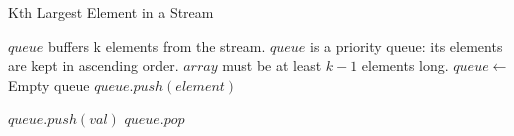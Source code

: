 \documentclass[12pt]{article}
\begin{document}
\begin{algorithm}

  \caption{Kth Largest Element in a Stream}
  \begin{algorithmic}[1]
    \Statex
        \LeftComment $queue$ buffers k elements from the stream.
        \LeftComment $queue$ is a priority queue: its elements are kept in ascending order.
        \LeftComment $array$ must be at least $k-1$ elements long.
        \Statex
        \State $queue \gets$ Empty queue
            \State $queue.push(element)$
        \EndFor
    \EndFunction

    \Statex
    \Statex
    
        \State $queue.push(val)$
            \State $queue.pop$
        \EndWhile
        \State {}
    \EndFunction
  \end{algorithmic}
  
\end{algorithm}
\end{document}
